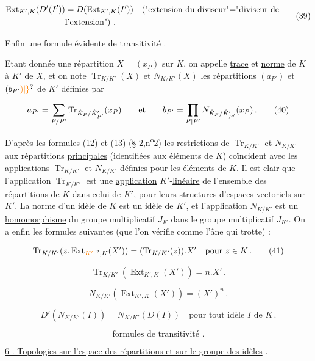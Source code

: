 \[ \begin{aligned} \operatorname{Ext}_{K',K}(D'(I'))&=D(\operatorname{Ext}_{K',K}(I'))\quad \text{(\textquotedbl{}extension du diviseur\textquotedbl{}=\textquotedbl{}diviseur de}\\ &\text{l'extension\textquotedbl{}) .}\end{aligned}\tag*{(39)} \]

Enfin une formule évidente de transitivité .

Etant donnée une répartition $X=(x_P)$ sur $K$, on appelle \uline{trace} et \uline{norme} de $K$ à $K'$ de $X$, et on note $\operatorname{Tr}_{K/K'}(X)$ et $N_{K/K'}(X)$ les répartitions $(a_{P'})$ et $(b_{P'}\unsure{)|\}}$ de $K'$ définies par

\[ a_{P'}=\sum_{P/P'}\operatorname{Tr}_{\hat K_P/\hat K'_{P'}}(x_P)\qquad \text{et}\qquad b_{P'}=\prod_{P\mid P'}N_{\hat K_P/\hat K'_{P'}}(x_P)\,.\tag*{(40)} \]

D'après les formules (12) et (13) (\S{} 2,n\textsuperscript{o}2) les restrictions de $\operatorname{Tr}_{K/K'}$ et $N_{K/K'}$ aux répartitions \uline{principales} (identifiées aux éléments de $K$) coïncident avec les applications $\operatorname{Tr}_{K/K'}$ et $N_{K/K'}$ définies pour les éléments de $K$. Il est clair que l'application $\operatorname{Tr}_{K/K'}$ est une \uline{application} $K'$-\uline{linéaire} de l'ensemble des répartitions de $K$ dans celui de $K'$, pour leurs structures d'espaces vectoriels sur $K'$. La norme d'un \uline{idèle} de $K$ est un idèle de $K'$, et l'application $N_{K/K'}$ est un \uline{homomorphisme} du groupe multiplicatif $J_K$ dans le groupe multiplicatif $J_{K'}$. On a enfin les formules suivantes (que l'on vérifie comme l'âne qui trotte) :

\[ \operatorname{Tr}_{K/K'}(z.\operatorname{Ext}_{\unsure{K'|\,},K}(X'))=(\operatorname{Tr}_{K/K'}(z)).X'\quad \text{pour }z\handwritten{\in}K\,.\tag*{(41)} \]

\[ \operatorname{Tr}_{K/K'}(\operatorname{Ext}_{K',K}(X'))=n.X'\,.\tag*{(42)} \]

\[ N_{K/K'}(\operatorname{Ext}_{K',K}(X'))=(X')^n\,.\tag*{(43)} \]

\[ D'(N_{K/K'}(I))=N_{K/K'}(D(I))\quad\text{pour tout idèle }I\text{ de }K\,.\tag*{(44)} \]

\[ \text{formules de transitivité .}\tag*{(45)} \]

\uline{6 . Topologies sur l'espace des répartitions et sur le groupe des idèles} .

